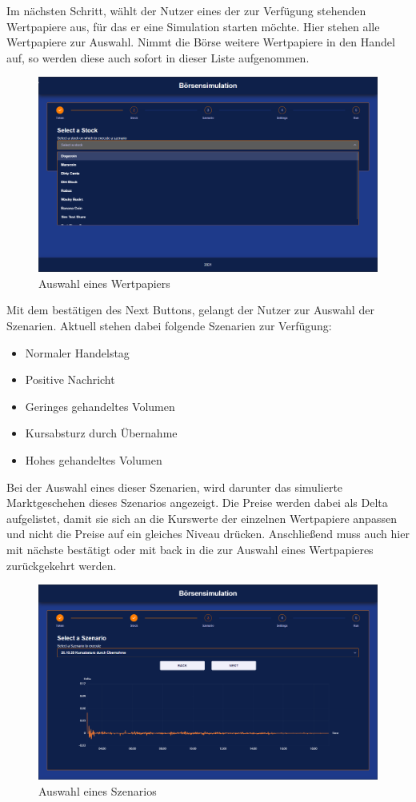 Im nächsten Schritt, wählt der Nutzer eines der zur Verfügung stehenden Wertpapiere aus, für das er eine Simulation starten möchte. Hier stehen alle Wertpapiere zur Auswahl. Nimmt die Börse weitere Wertpapiere in den Handel auf, so werden diese auch sofort in dieser Liste aufgenommen.
\begin{figure}[ht]
	\includegraphics[width=\textwidth]{img/Stock.png}
	\centering
	\caption{Auswahl eines Wertpapiers}
	\label{fig:stock}
\end{figure}

Mit dem bestätigen des Next Buttons, gelangt der Nutzer zur Auswahl der Szenarien. Aktuell stehen dabei folgende Szenarien zur Verfügung:

\begin{itemize}
	\item Normaler Handelstag
	\item Positive Nachricht
	\item Geringes gehandeltes Volumen
	\item Kursabsturz durch Übernahme
	\item Hohes gehandeltes Volumen
\end{itemize}

Bei der Auswahl eines dieser Szenarien, wird darunter das simulierte Marktgeschehen dieses Szenarios angezeigt. Die Preise werden dabei als Delta aufgelistet, damit sie sich an die Kurswerte der einzelnen Wertpapiere anpassen und nicht die Preise auf ein gleiches Niveau drücken. Anschließend muss auch hier mit nächste bestätigt oder mit back in die zur Auswahl eines Wertpapieres zurückgekehrt werden. 
\begin{figure}[ht]
	\includegraphics[width=\textwidth]{img/Szenario.png}
	\centering
	\caption{Auswahl eines Szenarios}
	\label{fig:szenario}
\end{figure}

